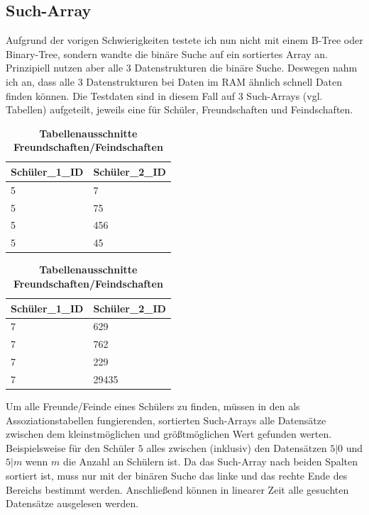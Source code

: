 \documentclass[11pt,a4paper]{article}
\begin{document}
\subsection{Such-Array}

Aufgrund der vorigen Schwierigkeiten testete ich nun nicht
mit einem B-Tree oder Binary-Tree, sondern wandte die binäre Suche
auf ein sortiertes Array an. Prinzipiell nutzen aber alle 3 Datenstrukturen die
binäre Suche. Deswegen nahm ich an, dass alle 3 Datenstrukturen bei Daten im RAM
ähnlich schnell Daten finden können.
Die Testdaten sind in diesem Fall auf 3 Such-Arrays (vgl. Tabellen)
aufgeteilt, jeweils eine für Schüler, Freundschaften und Feindschaften.

\begin{table}[H]
    \centering
    \begin{tabular}{|l|l|}
        \hline
        Schüler\_1\_ID & Schüler\_2\_ID \\ \hline
        5              & 7              \\ \hline
        5              & 75             \\ \hline
        5              & 456            \\ \hline
        5              & 45             \\ \hline
    \end{tabular}
    \qquad
    \begin{tabular}{|l|l|}
        \hline
        Schüler\_1\_ID & Schüler\_2\_ID \\ \hline
        7              & 629            \\ \hline
        7              & 762            \\ \hline
        7              & 229            \\ \hline
        7              & 29435          \\ \hline
    \end{tabular}
    \caption{\textbf{Tabellenausschnitte Freundschaften/Feindschaften}}
\end{table}

Um alle Freunde/Feinde eines Schülers zu finden, müssen in
den als Assoziationstabellen fungierenden, sortierten Such-Arrays
alle Datensätze zwischen dem kleinstmöglichen und größtmöglichen Wert
gefunden werten. Beispielsweise für den Schüler $5$ alles zwischen (inklusiv) den Datensätzen
$5 | 0$ und $5 | m$ wenn $m$ die Anzahl an Schülern ist. Da das Such-Array
nach beiden Spalten sortiert ist, muss nur mit der binären Suche das linke
und das rechte Ende des Bereichs bestimmt werden. Anschließend können in linearer
Zeit alle gesuchten Datensätze ausgelesen werden.
\end{document}
